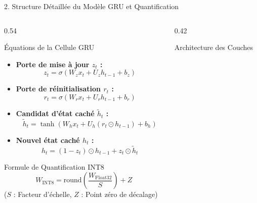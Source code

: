 \documentclass[10pt,aspectratio=169]{beamer}
\begin{document}
\begin{frame}{2. Structure Détaillée du Modèle GRU et Quantification}
  \begin{columns}[T]
    \begin{column}{0.54\textwidth}
      \begin{block}{Équations de la Cellule GRU}
        \begin{itemize}
          \item \textbf{Porte de mise à jour $z_t$ :}
                $$z_t = \sigma(W_z x_t + U_z h_{t-1} + b_z)$$
          \item \textbf{Porte de réinitialisation $r_t$ :}
                $$r_t = \sigma(W_r x_t + U_r h_{t-1} + b_r)$$
          \item \textbf{Candidat d'état caché $\tilde{h}_t$ :}
                $$\tilde{h}_t = \tanh(W_h x_t + U_h (r_t \odot h_{t-1}) + b_h)$$
          \item \textbf{Nouvel état caché $h_t$ :}
                $$h_t = (1 - z_t) \odot h_{t-1} + z_t \odot \tilde{h}_t$$
        \end{itemize}
      \end{block}
      
      \begin{block}{Formule de Quantification INT8}
        $$W_{\text{INT8}} = \text{round}\left(\frac{W_{\text{Float32}}}{S}\right) + Z$$
        {\tiny ($S$ : Facteur d'échelle, $Z$ : Point zéro de décalage)}
      \end{block}
    \end{column}
    
    \begin{column}{0.42\textwidth}
      \begin{exampleblock}{Architecture des Couches}
        \centering
        \vspace{0.2em}
\end{exampleblock}
\end{column}
\end{columns}
\end{frame}
\end{document}
